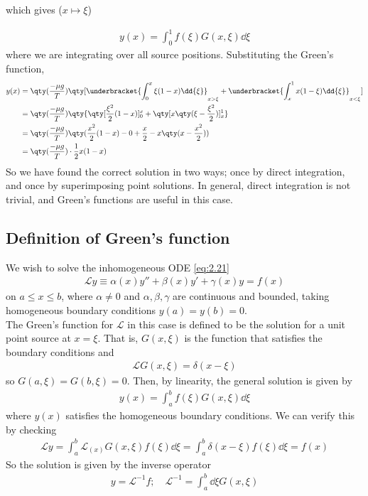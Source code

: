 which gives ($x \mapsto \xi$)
\addtocounter{equation}{1}
\begin{align} \label{eq:7.5}
	y(x) = \int_0^1 f(\xi) G(x,\xi) \dd{\xi}
\end{align}
where we are integrating over all source positions.
Substituting the Green's function,
\begin{align*}
	y(x) & = \qty(\frac{-\mu g}{T}) \qty[ \underbracket{\int_0^x \xi(1-x) \dd{\xi}}_{x > \xi} + \underbracket{\int_x^1 x(1-\xi) \dd{\xi}}_{x < \xi}] \\
    &= \qty(\frac{-\mu g}{T}) \qty{ \qty[\frac{\xi^2}{2}(1-x)]_0^x + \qty[x \qty(\xi - \frac{\xi^2}{2})]_x^1 } \\
    &= \qty(\frac{-\mu g}{T}) \qty(\frac{x^2}{2}(1-x) - 0 + \frac{x}{2} - x\qty(x-\frac{x^2}{2}))  \\
    &= \qty(\frac{-\mu g}{T}) \cdot \frac{1}{2}x(1-x)
\end{align*}
So we have found the correct solution in two ways; once by direct integration, and once by superimposing point solutions.
In general, direct integration is not trivial, and Green's functions are useful in this case.

\subsection{Definition of Green's function}
We wish to solve the inhomogeneous ODE \cref{eq:2.21}
\begin{align} \label{eq:7.6}
	\mathcal L y \equiv \alpha(x) y'' + \beta(x) y' + \gamma(x) y = f(x)
\end{align}
on $a \leq x \leq b$, where $\alpha \neq 0$ and $\alpha, \beta, \gamma$ are continuous and bounded, taking homogeneous boundary conditions $y(a) = y(b) = 0$. \\
The Green's function for $\mathcal L$ in this case is defined to be the solution for a unit point source at $x = \xi$.
That is, $G(x,\xi)$ is the function that satisfies the boundary conditions and
\begin{align} \label{eq:7.7}
	\mathcal L G(x,\xi) = \delta(x-\xi)
\end{align}
so $G(a,\xi) = G(b,\xi) = 0$.
Then, by linearity, the general solution is given by
\begin{align} \label{eq:7.8}
	y(x) = \int_a^b f(\xi) G(x,\xi) \dd{\xi}
\end{align}
where $y(x)$ satisfies the homogeneous boundary conditions.
We can verify this by checking
\begin{align*}
	\mathcal L y = \int_a^b \mathcal L_{(x)} G(x,\xi) f(\xi) \dd{\xi} = \int_a^b \delta(x-\xi) f(\xi) \dd{\xi} = f(x)
\end{align*}
So the solution is given by the inverse operator
\begin{align*}
	y = \mathcal L^{-1} f;\quad \mathcal L^{-1} = \int_a^b \dd{\xi} G(x,\xi)
\end{align*}

